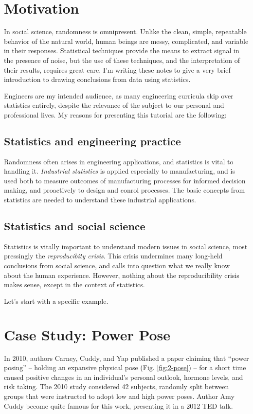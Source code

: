 \documentclass{tufte-handout}
\begin{document}
\section{Motivation}
\label{sec:org93c1649}
In social science, randomness is omnipresent. Unlike the clean, simple,
repeatable behavior of the natural world, human beings are messy, complicated,
and variable in their responses. Statistical techniques provide the means to
extract signal in the presence of noise, but the use of these techniques, and
the interpretation of their results, requires great care. I'm writing these
notes to give a very brief introduction to drawing conclusions from data using
statistics.

Engineers are my intended audience, as many engineering curricula skip over
statistics entirely, despite the relevance of the subject to our personal and
professional lives. My reasons for presenting this tutorial are the following:

\subsection{Statistics and engineering practice}
\label{sec:orgc29274a}
Randomness often arises in engineering applications, and statistics is vital to
handling it. \emph{Industrial statistics} is applied especially to manufacturing, and
is used both to measure outcomes of manufacturing processes for informed
decision making, and proactively to design and conrol processes. The basic
concepts from statistics are needed to understand these industrial applications.

\subsection{Statistics and social science}
\label{sec:org81c80bd}
Statistics is vitally important to understand modern issues in social science,
most pressingly the \emph{reproducibity crisis}.\cite{open2015estimating} This crisis
undermines many long-held conclusions from social science, and calls into
question what we really know about the human experience. However, nothing about
the reproducibility crisis makes sense, except in the context of statistics.

Let's start with a specific example.
\section{Case Study: Power Pose}
\label{sec:orgb77ef42}
In 2010, authors Carney, Cuddy, and Yap \cite{carney2010power} published a paper
claiming that ``power posing'' -- holding an expansive physical pose (Fig.
\ref{fig:2-pose}) -- for a short time caused positive changes in an individual's
personal outlook, hormone levels, and risk taking. The 2010 study considered 42
subjects, randomly split between groups that were instructed to adopt low and
high power poses. Author Amy Cuddy \cite{cuddy2012ted} become quite famous for
this work, presenting it in a 2012 TED talk.
\end{document}
